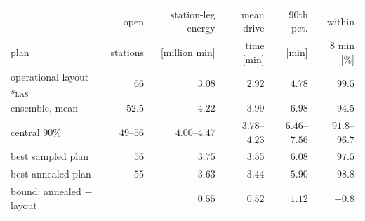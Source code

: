\begin{tabular}{lrrrrr}
\toprule
 & open & station-leg energy & mean drive & $90$th pct. & within \\
plan & stations & [million min] & time [min] & [min] & $8$ min [\%] \\
\midrule
operational layout $s_{\mathrm{LAS}}$ & $66$ & $3.08$ & $2.92$ & $4.78$ & $99.5$ \\
\midrule
ensemble, mean & $52.5$ & $4.22$ & $3.99$ & $6.98$ & $94.5$ \\
\quad central $90\%$ & $49$--$56$ & $4.00$--$4.47$ & $3.78$--$4.23$ & $6.46$--$7.56$ & $91.8$--$96.7$ \\
best sampled plan & $56$ & $3.75$ & $3.55$ & $6.08$ & $97.5$ \\
best annealed plan & $55$ & $3.63$ & $3.44$ & $5.90$ & $98.8$ \\
\midrule
bound: annealed $-$ layout & & $0.55$ & $0.52$ & $1.12$ & $-0.8$ \\
\bottomrule
\end{tabular}
